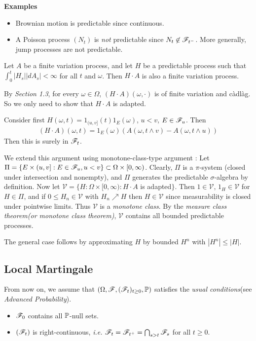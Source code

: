 \documentclass[12pt,a4paper]{article}
\newenvironment{proof}
{\begin{changemargin}{0.5cm}{0.5cm} 
	}%
	{\end{changemargin}
}
\renewenvironment{i}
{\begin{itemize} 
	}%
	{\end{itemize}
}
\newenvironment{p}
{\begin{proof} 
	}%
	{\end{proof}
}
\begin{document}
\textbf{Examples} \begin{i}
\item Brownian motion is predictable since continuous.
\item A Poisson process $(N_t)$ is \emph{not} predictable since $N_t \not\in \mathscr{F}_{t^-}$. More generally, jump processes are not predictable.
\end{i}
\s

\prop Let $A$ be a finite variation process, and let $H$ be a predictable process such that $\int_0^t |H_s| |dA_s| < \infty$ for all $t$ and $\omega$. Then $H\cdot A$ is also a finite variation process.
\begin{p}
\pf By \textit{Section 1.3}, for every $\omega \in \Omega$, $(H\cdot A)(\omega, \cdot)$ is of finite variation and c\`adl\`ag. So we only need to show that $H\cdot A$ is adapted.

\quad Consider first $H(\omega, t) = 1_{(u,v]}(t) 1_E(\omega)$, $u< v$, $E\in \mathscr{F}_u$. Then
\begin{align*}
(H\cdot A)(\omega, t) = 1_E(\omega)(A(\omega, t\wedge v) - A(\omega, t\wedge u))
\end{align*}
Then this is surely in $\mathscr{F}_t$.

\quad We extend this argument using monotone-class-type argument : Let $\Pi = \{ E\times(u,v] : E\in \mathscr{F}_u, u<v\} \subset \Omega \times [0, \infty)$. Clearly, $\Pi$ is a $\pi$-system (closed under intersection and nonempty), and $\Pi$ generates the predictable $\sigma$-algebra by definition. Now let $\mathscr{V} = \{ H : \Omega \times[0, \infty) : H\cdot A$ is adapted$\}$. Then $1\in \mathscr{V}$, $1_H \in \mathscr{V}$ for $H \in \Pi$, and if $0\leq H_n \in \mathscr{V}$ with $H_n \nearrow H$ then $H\in \mathscr{V}$ since measurability is closed under pointwise limits. Thus $\mathscr{V}$ is a \emph{monotone class}. By the \emph{measure class theorem(or monotone class theorem)}, $\mathscr{V}$ contains all bounded predictable processes.

\quad The general case follows by approximating $H$ by bounded $H^n$ with $|H^n|\leq |H|$. 

\eop
\end{p}

\subsection{Local Martingale}

From now on, we assume that $(\Omega, \mathscr{F}, (\mathscr{F}_t)_{t\geq 0}, \mathbb{P})$ satisfies the \emph{usual conditions}(see \emph{Advanced Probability}).
\begin{i}
\item $\mathscr{F}_0$ contains all $\mathbb{P}$-null sets. 
\item $(\mathscr{F}_t)$ is right-continuous, \textit{i.e.} $\mathscr{F}_t =\mathscr{F}_{t^+} = \bigcap_{s>t} \mathscr{F}_s$ for all $t\geq 0$.
\end{i}
\s
\end{document}
